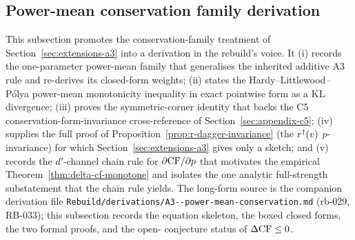 \subsection{Power-mean conservation family derivation}
\label{sec:appendix-deriv-a3}

This subsection promotes the conservation-family treatment of
Section~\ref{sec:extensions-a3} into a derivation in the rebuild's
voice. It (i) records the one-parameter power-mean family that
generalises the inherited additive A3 rule and re-derives its
closed-form weights; (ii) states the Hardy--Littlewood--Pólya
power-mean monotonicity inequality in exact pointwise form as a
KL divergence; (iii) proves the symmetric-corner identity that
backs the C5 conservation-form-invariance cross-reference of
Section~\ref{sec:appendix-c5}; (iv) supplies the full proof of
Proposition~\ref{prop:r-dagger-invariance} (the $r^{\dagger}(v)$
$p$-invariance) for which Section~\ref{sec:extensions-a3} gives
only a sketch; and (v) records the $d'$-channel chain rule for
$\partial \mathrm{CF}/\partial p$ that motivates the empirical
Theorem~\ref{thm:delta-cf-monotone} and isolates the one analytic
full-strength substatement that the chain rule yields. The
long-form source is the companion derivation file
\texttt{Rebuild/derivations/A3{-}{-}power-mean-conservation.md}
(rb-029, RB-033); this subsection records the equation skeleton,
the boxed closed forms, the two formal proofs, and the open-
conjecture status of $\Delta\mathrm{CF} \le 0$.

